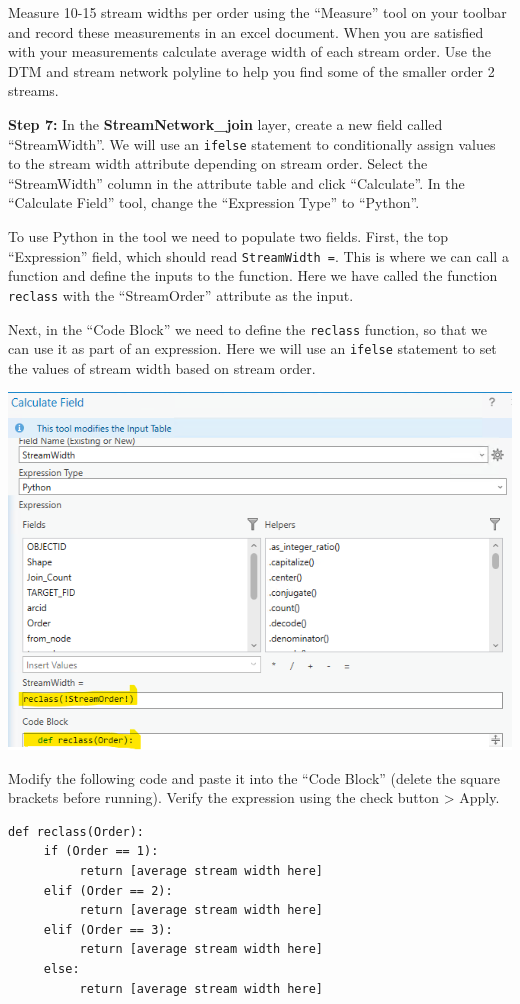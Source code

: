 \documentclass[
]{book}
\begin{document}
Measure 10-15 stream widths per order using the ``Measure'' tool on your toolbar and record these measurements in an excel document. When you are satisfied with your measurements calculate average width of each stream order. Use the DTM and stream network polyline to help you find some of the smaller order 2 streams.

\textbf{Step 7:} In the \textbf{StreamNetwork\_join} layer, create a new field called ``StreamWidth''. We will use an \texttt{ifelse} statement to conditionally assign values to the stream width attribute depending on stream order. Select the ``StreamWidth'' column in the attribute table and click ``Calculate''. In the ``Calculate Field'' tool, change the ``Expression Type'' to ``Python''.

To use Python in the tool we need to populate two fields. First, the top ``Expression'' field, which should read \texttt{StreamWidth\ =}. This is where we can call a function and define the inputs to the function. Here we have called the function \texttt{reclass} with the ``StreamOrder'' attribute as the input.

Next, in the ``Code Block'' we need to define the \texttt{reclass} function, so that we can use it as part of an expression. Here we will use an \texttt{ifelse} statement to set the values of stream width based on stream order.

\includegraphics[width=0.75\linewidth]{images/03-python-stream-width}

Modify the following code and paste it into the ``Code Block'' (delete the square brackets before running). Verify the expression using the check button \textgreater{} Apply.

\begin{verbatim}
def reclass(Order):
     if (Order == 1):
          return [average stream width here]
     elif (Order == 2):
          return [average stream width here]
     elif (Order == 3):
          return [average stream width here]
     else:
          return [average stream width here]
\end{verbatim}
\end{document}
